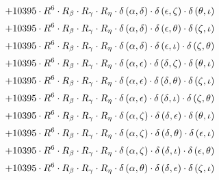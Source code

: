 \begin{subequations}
\begin{gather}
 \\[0.2em] \notag 		 + 10395 \cdot R^{6} \cdot R_{\beta{}} \cdot R_{\gamma{}} \cdot R_{\eta{}} \cdot \delta{}\left(\alpha{}, \delta{}\right) \cdot \delta{}\left(\epsilon{}, \zeta{}\right) \cdot \delta{}\left(\theta{}, \iota{}\right) 
 \\[0.2em] \notag 		 + 10395 \cdot R^{6} \cdot R_{\beta{}} \cdot R_{\gamma{}} \cdot R_{\eta{}} \cdot \delta{}\left(\alpha{}, \delta{}\right) \cdot \delta{}\left(\epsilon{}, \theta{}\right) \cdot \delta{}\left(\zeta{}, \iota{}\right) 
 \\[0.2em] \notag 		 + 10395 \cdot R^{6} \cdot R_{\beta{}} \cdot R_{\gamma{}} \cdot R_{\eta{}} \cdot \delta{}\left(\alpha{}, \delta{}\right) \cdot \delta{}\left(\epsilon{}, \iota{}\right) \cdot \delta{}\left(\zeta{}, \theta{}\right) 
 \\[0.2em] \notag 		 + 10395 \cdot R^{6} \cdot R_{\beta{}} \cdot R_{\gamma{}} \cdot R_{\eta{}} \cdot \delta{}\left(\alpha{}, \epsilon{}\right) \cdot \delta{}\left(\delta{}, \zeta{}\right) \cdot \delta{}\left(\theta{}, \iota{}\right) 
 \\[0.2em] \notag 		 + 10395 \cdot R^{6} \cdot R_{\beta{}} \cdot R_{\gamma{}} \cdot R_{\eta{}} \cdot \delta{}\left(\alpha{}, \epsilon{}\right) \cdot \delta{}\left(\delta{}, \theta{}\right) \cdot \delta{}\left(\zeta{}, \iota{}\right) 
 \\[0.2em] \notag 		 + 10395 \cdot R^{6} \cdot R_{\beta{}} \cdot R_{\gamma{}} \cdot R_{\eta{}} \cdot \delta{}\left(\alpha{}, \epsilon{}\right) \cdot \delta{}\left(\delta{}, \iota{}\right) \cdot \delta{}\left(\zeta{}, \theta{}\right) 
 \\[0.2em] \notag 		 + 10395 \cdot R^{6} \cdot R_{\beta{}} \cdot R_{\gamma{}} \cdot R_{\eta{}} \cdot \delta{}\left(\alpha{}, \zeta{}\right) \cdot \delta{}\left(\delta{}, \epsilon{}\right) \cdot \delta{}\left(\theta{}, \iota{}\right) 
 \\[0.2em] \notag 		 + 10395 \cdot R^{6} \cdot R_{\beta{}} \cdot R_{\gamma{}} \cdot R_{\eta{}} \cdot \delta{}\left(\alpha{}, \zeta{}\right) \cdot \delta{}\left(\delta{}, \theta{}\right) \cdot \delta{}\left(\epsilon{}, \iota{}\right) 
 \\[0.2em] \notag 		 + 10395 \cdot R^{6} \cdot R_{\beta{}} \cdot R_{\gamma{}} \cdot R_{\eta{}} \cdot \delta{}\left(\alpha{}, \zeta{}\right) \cdot \delta{}\left(\delta{}, \iota{}\right) \cdot \delta{}\left(\epsilon{}, \theta{}\right) 
 \\[0.2em] \notag 		 + 10395 \cdot R^{6} \cdot R_{\beta{}} \cdot R_{\gamma{}} \cdot R_{\eta{}} \cdot \delta{}\left(\alpha{}, \theta{}\right) \cdot \delta{}\left(\delta{}, \epsilon{}\right) \cdot \delta{}\left(\zeta{}, \iota{}\right) 

\end{gather}
\end{subequations}
